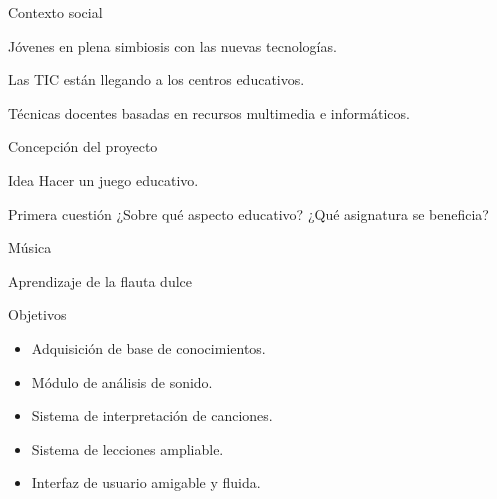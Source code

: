 
\begin{frame}{Contexto social}
  \begin{center}
    \Large

    Jóvenes en plena simbiosis con las nuevas tecnologías.

    \bigskip
    \pause
    \bigskip

    Las TIC están llegando a los centros educativos.

    \bigskip
    \pause
    \bigskip

    Técnicas docentes basadas en recursos multimedia e informáticos.

  \end{center}
\end{frame}

\begin{frame}{Concepción del proyecto}
  \begin{block}{Idea}
    Hacer un juego educativo.
  \end{block}

  \pause

  \begin{block}{Primera cuestión}
    ¿Sobre qué aspecto educativo? ¿Qué asignatura se beneficia?
  \end{block}

  \vspace{0.5cm}
  \pause

  \begin{center}
    \LARGE Música \\[0.5cm]

    \pause

    \LARGE Aprendizaje de la flauta dulce
  \end{center}
\end{frame}

\begin{frame}{Objetivos}
  \Large
  \begin{itemize}
  \item Adquisición de base de conocimientos. \pause
  \item Módulo de análisis de sonido. \pause
  \item Sistema de interpretación de canciones. \pause
  \item Sistema de lecciones ampliable. \pause
  \item Interfaz de usuario amigable y fluida.
  \end{itemize}
\end{frame}

